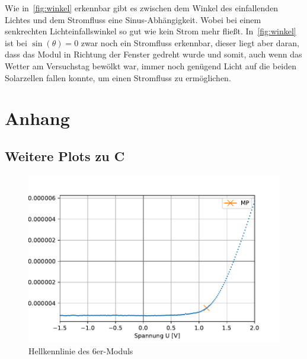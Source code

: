 \documentclass[slug=SZ, room=Hermann-Krone-Bau\,\ Labor\ 1.25, supervisor=Martin\ Kroll]{../../Lab_Report_LaTeX/lab_report}
\begin{document}
Wie in~\ref{fig:winkel} erkennbar gibt es zwischen dem Winkel des einfallenden
Lichtes und dem Stromfluss eine Sinus-Abhängigkeit. Wobei bei einem senkrechten
Lichteinfallswinkel so gut wie kein Strom mehr fließt.
In~\ref{fig:winkel} ist bei \(\sin(\theta) = 0\) zwar noch ein Stromfluss erkennbar,
dieser liegt aber daran, dass das Modul in Richtung der Fenster gedreht wurde und somit,
auch wenn das Wetter am Versuchstag bewölkt war, immer noch genügend Licht auf die beiden
Solarzellen fallen konnte, um einen Stromfluss zu ermöglichen.

\section{Anhang}
\label{sec:anh}

\subsection{Weitere Plots zu C}
\label{sec:plotsc}

\begin{figure}[H]\centering
	\includegraphics[width=.5\columnwidth]{figs/python/C/3x3_hell.pdf}
	\caption{Hellkennlinie des 6er-Moduls}
	\label{diag:hell6er}
\end{figure}
\end{document}
